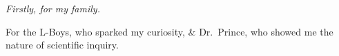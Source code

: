 {
\centering
{
\it
Firstly, for my family.

For the L-Boys, who sparked my curiosity, \& Dr.~Prince, who showed me the nature of scientific inquiry.
}
\par
}
\restoregeometry
\doublespace
\vspace{0.25\textheight}
